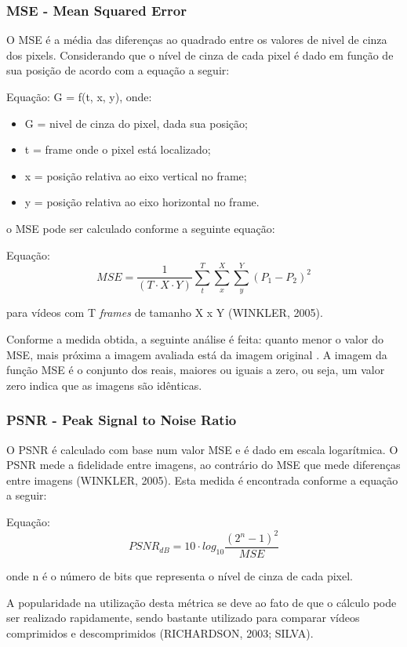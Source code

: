 \subsubsection{MSE - Mean Squared Error}

O MSE é a média das diferenças ao quadrado entre os valores de nivel de cinza dos pixels. Considerando que o nível de cinza de cada pixel é dado em função de sua posição de acordo com a equação a seguir:

Equação: G = f(t, x, y), onde:

\begin{itemize}
	\item G = nivel de cinza do pixel, dada sua posição;
	\item t = frame onde o pixel está localizado;
	\item x = posição relativa ao eixo vertical no frame;
	\item y = posição relativa ao eixo horizontal no frame.
\end{itemize}

o MSE pode ser calculado conforme a seguinte equação:

    Equação: \[MSE = \frac{1}{\left (T \cdot X \cdot Y \right )} \sum_{t}^{T} \sum_{x}^{X} \sum_{y}^{Y} \left ( P_{1} - P_{2} \right )^{2}\]

para vídeos com T \emph{frames} de tamanho X x Y (WINKLER, 2005).

    Conforme a medida obtida, a seguinte análise é feita: quanto menor o valor do MSE, mais próxima a imagem avaliada está da imagem original \cite{albini}. A imagem da função MSE é o conjunto dos reais, maiores ou iguais a zero, ou seja, um valor zero indica que as imagens são idênticas.

\subsubsection{PSNR - Peak Signal to Noise Ratio}
O PSNR é calculado com base num valor MSE e é dado em escala logarítmica. O PSNR mede a fidelidade entre imagens, ao contrário do MSE que mede diferenças entre imagens (WINKLER, 2005). Esta medida é encontrada conforme a equação a seguir:

Equação: \[PSNR_{dB} = 10 \cdot log_{10} \frac{{\left(2^{n} -1 \right )}^{2}}{MSE}\]

onde n é o número de bits que representa o nível de cinza de cada pixel.

A popularidade na utilização desta métrica se deve ao fato de que o cálculo pode ser realizado rapidamente, sendo bastante utilizado para comparar vídeos comprimidos e descomprimidos (RICHARDSON, 2003; SILVA).

